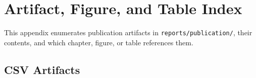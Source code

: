 \chapter{Artifact, Figure, and Table Index}
\label{app:artifact-index}

This appendix enumerates publication artifacts in \texttt{reports/publication/}, their contents, and which chapter, figure, or table references them.

\section{CSV Artifacts}

